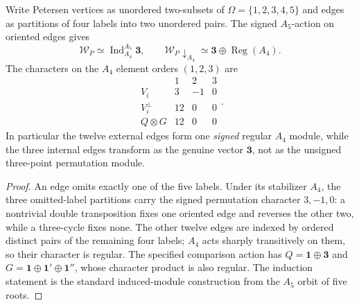 \documentclass[11pt,a4paper]{article}
\begin{document}
\begin{proposition}
\label{p5d:prop:v321-rooted-edge-characters}
Write Petersen vertices as unordered two-subsets of
$\Omega=\{1,2,3,4,5\}$ and edges as partitions of four labels into two
unordered pairs. The signed $A_5$-action on oriented edges gives
\[
 \mathscr W_P\simeq\operatorname{Ind}_{A_4}^{A_5}\mathbf3,
 \qquad
 \mathscr W_P\!\downarrow_{A_4}
   \simeq\mathbf3\oplus\operatorname{Reg}(A_4).
\]
The characters on the $A_4$ element orders $(1,2,3)$ are
\[
 \begin{array}{c|ccc}
 &1&2&3\\ \hline
 V_i&3&-1&0\\
 V_i^\perp&12&0&0\\
 Q\otimes G&12&0&0
 \end{array}.
\]
In particular the twelve external edges form one \emph{signed} regular
$A_4$ module, while the three internal edges transform as the genuine
vector $\mathbf3$, not as the unsigned three-point permutation module.
\end{proposition}
\begin{proof}
An edge omits exactly one of the five labels. Under its stabilizer $A_4$,
the three omitted-label partitions carry the signed permutation character
$3,-1,0$: a nontrivial double transposition fixes one oriented edge and
reverses the other two, while a three-cycle fixes none. The other twelve
edges are indexed by ordered distinct pairs of the remaining four labels;
$A_4$ acts sharply transitively on them, so their character is regular.
The specified comparison action has $Q=\mathbf1\oplus\mathbf3$ and
$G=\mathbf1\oplus\mathbf1'\oplus\mathbf1''$, whose character product is
also regular. The induction statement is the standard induced-module
construction from the $A_5$ orbit of five roots.
\end{proof}
\end{document}
